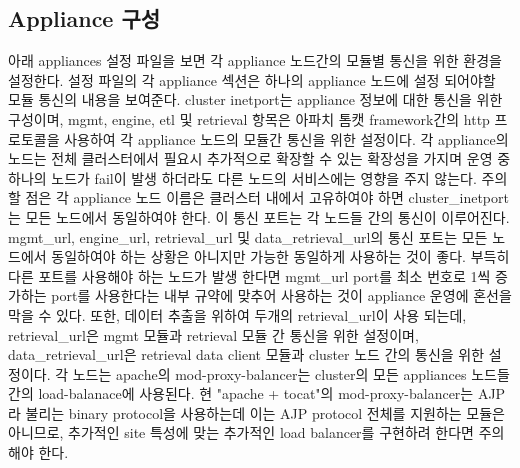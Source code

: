 \documentclass[11pt
  , a4paper
  , article
  , oneside
]{memoir}
\begin{document}
\subsection{Appliance 구성}
아래 appliances 설정 파일을 보면 각 appliance 노드간의 모듈별 통신을 위한 환경을 설정한다. 설정 파일의 각 appliance 섹션은 하나의 appliance 노드에 설정 되어야할 모듈 통신의 내용을 보여준다. cluster inetport는 appliance 정보에 대한 통신을 위한 구성이며, mgmt, engine, etl 및 retrieval 항목은 아파치 톰캣 framework간의 http 프로토콜을 사용하여 각 appliance 노드의 모듈간 통신을 위한 설정이다. 각 appliance의 노드는 전체 클러스터에서 필요시 추가적으로 확장할 수 있는 확장성을 가지며 운영 중 하나의 노드가 fail이 발생 하더라도 다른 노드의 서비스에는 영향을 주지 않는다. 주의 할 점은 각 appliance 노드 이름은 클러스터 내에서 고유하여야 하면 cluster\_inetport는 모든 노드에서 동일하여야 한다. 이 통신 포트는 각 노드들 간의 통신이 이루어진다. mgmt\_url, engine\_url, retrieval\_url 및 data\_retrieval\_url의 통신 포트는 모든 노드에서 동일하여야 하는 상황은 아니지만 가능한 동일하게 사용하는 것이 좋다. 부득히 다른 포트를 사용해야 하는 노드가 발생 한다면 mgmt\_url port를 최소 번호로 1씩 증가하는 port를 사용한다는 내부 규약에 맞추어 사용하는 것이 appliance 운영에 혼선을 막을 수 있다. 또한, 데이터 추출을 위하여 두개의 retrieval\_url이 사용 되는데, retrieval\_url은 mgmt 모듈과 retrieval 모듈 간 통신을 위한 설정이며, data\_retrieval\_url은 retrieval data client 모듈과 cluster 노드 간의 통신을 위한 설정이다. 각 노드는 apache의 mod-proxy-balancer는 cluster의 모든 appliances 노드들 간의 load-balanace에 사용된다. 현 "apache + tocat"의 mod-proxy-balancer는 AJP라 불리는 binary protocol을 사용하는데 이는 AJP protocol 전체를 지원하는 모듈은 아니므로, 추가적인 site 특성에 맞는 추가적인 load balancer를 구현하려 한다면 주의해야 한다.
\end{document}
